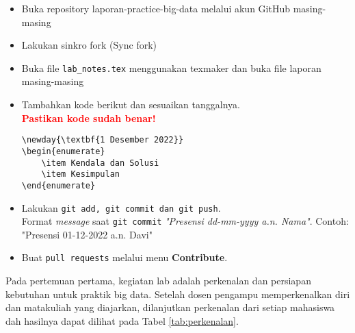 \documentclass[a4paper]{tufte-handout}
\begin{document}
\begin{maybe}
\begin{itemize}
\begin{itemize}
\item Buka repository laporan-practice-big-data melalui akun GitHub masing-masing
\item Lakukan sinkro fork (Sync fork)
\item Buka file {\tt lab\_notes.tex} menggunakan texmaker dan buka file laporan masing-masing
\item Tambahkan kode berikut dan sesuaikan tanggalnya. \\
\textbf{\textcolor{red}{Pastikan kode sudah benar!}}
\begin{lstlisting}
\newday{\textbf{1 Desember 2022}}
\begin{enumerate}
	\item Kendala dan Solusi
	\item Kesimpulan
\end{enumerate}
\end{lstlisting}
\item Lakukan {\tt git add, git commit dan git push}. \\ 
Format \textit{message} saat {\tt git commit} \textit{"Presensi dd-mm-yyyy a.n. Nama"}. Contoh: "Presensi 01-12-2022 a.n. Davi"
\item Buat {\tt pull requests} melalui menu \textbf{Contribute}.
\end{itemize}
\end{itemize}
\end{maybe}

\clearpage
{}


Pada pertemuan pertama, kegiatan lab adalah perkenalan dan persiapan kebutuhan untuk praktik big data. Setelah dosen pengampu memperkenalkan diri dan matakuliah yang diajarkan, dilanjutkan perkenalan dari setiap mahasiswa dah hasilnya dapat dilihat pada Tabel \ref{tab:perkenalan}.
\end{document}
